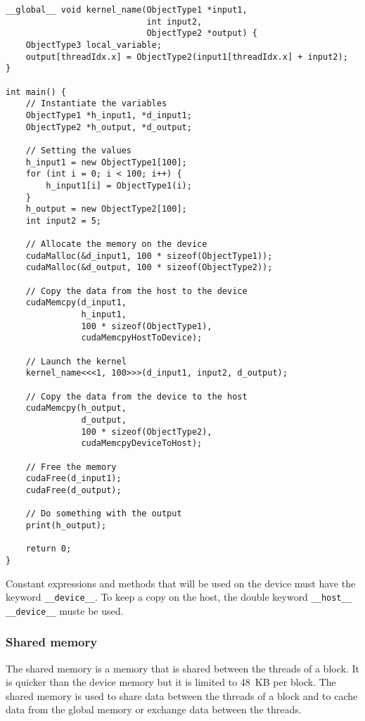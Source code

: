 \begin{code}
    \label{code:analyze:cuda:memory:device:copy-read}
    \begin{verbatim}
__global__ void kernel_name(ObjectType1 *input1,
                            int input2,
                            ObjectType2 *output) {
    ObjectType3 local_variable;
    output[threadIdx.x] = ObjectType2(input1[threadIdx.x] + input2);
}

int main() {
    // Instantiate the variables
    ObjectType1 *h_input1, *d_input1;
    ObjectType2 *h_output, *d_output;

    // Setting the values
    h_input1 = new ObjectType1[100];
    for (int i = 0; i < 100; i++) {
        h_input1[i] = ObjectType1(i);
    }
    h_output = new ObjectType2[100];
    int input2 = 5;

    // Allocate the memory on the device
    cudaMalloc(&d_input1, 100 * sizeof(ObjectType1));
    cudaMalloc(&d_output, 100 * sizeof(ObjectType2));

    // Copy the data from the host to the device
    cudaMemcpy(d_input1,
               h_input1,
               100 * sizeof(ObjectType1),
               cudaMemcpyHostToDevice);

    // Launch the kernel
    kernel_name<<<1, 100>>>(d_input1, input2, d_output);

    // Copy the data from the device to the host
    cudaMemcpy(h_output,
               d_output,
               100 * sizeof(ObjectType2),
               cudaMemcpyDeviceToHost);

    // Free the memory
    cudaFree(d_input1);
    cudaFree(d_output);

    // Do something with the output
    print(h_output);

    return 0;
}
    \end{verbatim}
\end{code}

Constant expressions and methods that will be used on the device must have the
keyword \texttt{\_\_device\_\_}.
To keep a copy on the host, the double keyword
\texttt{\_\_host\_\_ \_\_device\_\_} muste be used.


\subsubsection{Shared memory}
\label{ch:analyze:cuda:memory:shared}

The shared memory is a memory that is shared between the threads of a block.
It is quicker than the device memory but it is limited to 48~KB per block.
The shared memory is used to share data between the threads of a block and to
cache data from the global memory or exchange data between the threads.

